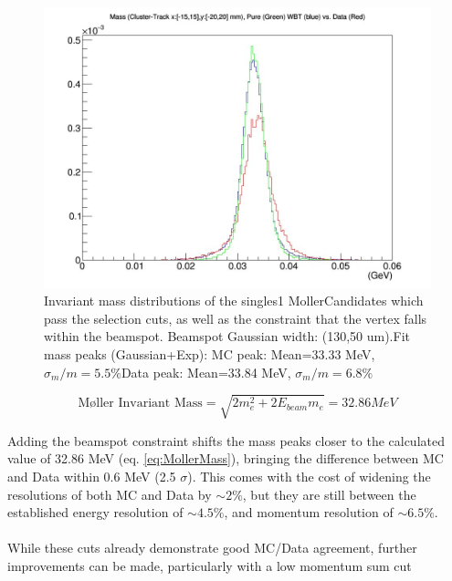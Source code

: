 \documentclass{article}
\begin{document}
\begin{figure}[H]
  	\includegraphics[width=\linewidth]{MollerPlots/massWithBSC}
  	\caption{Invariant mass distributions of the singles1 MollerCandidates which pass the selection cuts, as well as the constraint that the vertex falls within the beamspot. Beamspot Gaussian width: (130,50 um).\newline\newline Fit mass peaks (Gaussian+Exp): \newline MC peak: Mean=33.33 MeV,  $\sigma_m/m = 5.5\%$\newline Data peak: Mean=33.84 MeV, $\sigma_m/m = 6.8\%$}
  	\label{fig:massCut2}
	\end{figure}

\begin{equation} \label{eq:MollerMass}
  	\mbox{M\o ller Invariant Mass} = \sqrt{2m_e^2 + 2E_{beam}m_e} = 32.86 MeV
	\end{equation}\newline

Adding the beamspot constraint shifts the mass peaks closer to the calculated value of 32.86 MeV (eq. \ref{eq:MollerMass}), bringing the difference between MC and Data within 0.6 MeV (2.5 $\sigma$). This comes with the cost of widening the resolutions of both MC and Data by $\sim 2\%$, but they are still between the established energy resolution of $\sim 4.5\%$, and momentum resolution of $\sim 6.5 \%$.

\paragraph{}
While these cuts already demonstrate good MC/Data agreement, further improvements can be made, particularly with a low momentum sum cut
\end{document}
